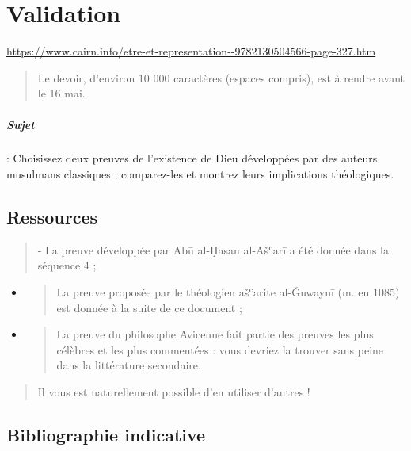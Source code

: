 \chapter{Validation}

\url{https://www.cairn.info/etre-et-representation--9782130504566-page-327.htm}

\begin{quote}
Le devoir, d'environ 10 000 caractères (espaces compris), est à rendre
avant le 16 mai.
\end{quote}
\paragraph{Sujet} : Choisissez deux preuves de l’existence de Dieu développées par des auteurs
musulmans classiques ; comparez-les et montrez leurs implications théologiques.

\hypertarget{ressources}{%
\section{Ressources}\label{ressources}}

\begin{quote}
- La preuve développée par Abū al-Ḥasan al-Ašʿarī a été donnée dans la
séquence 4 ;
\end{quote}

\begin{itemize}
\item
  \begin{quote}
  La preuve proposée par le théologien ašʿarite al-Ǧuwaynī (m. en 1085)
  est donnée à la suite de ce document ;
  \end{quote}
\item
  \begin{quote}
  La preuve du philosophe Avicenne fait partie des preuves les plus
  célèbres et les plus commentées : vous devriez la trouver sans peine
  dans la littérature secondaire.
  \end{quote}
\end{itemize}

\begin{quote}
Il vous est naturellement possible d'en utiliser d'autres !
\end{quote}

\hypertarget{bibliographie-indicative}{%
\section{Bibliographie indicative}\label{bibliographie-indicative}}


